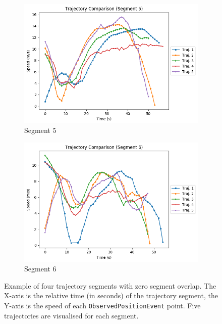 \begin{figure}
\begin{subfigure}[b]{0.475\textwidth}
        \includegraphics[width=\textwidth]{figures/speed_comparison_5}
        \caption[]%
        {{\small Segment 5}}    
        \label{fig:segment-3}
    \end{subfigure}
    \quad
    \begin{subfigure}[b]{0.475\textwidth}   
        \centering 
        \includegraphics[width=\textwidth]{figures/speed_comparison_6}
        \caption[]%
        {{\small Segment 6}}    
        \label{fig:segment-4}
    \end{subfigure}
    \caption[ Example of trajectory segments ]
    {{\small Example of four trajectory segments with zero segment overlap.
    The X-axis is the relative time (in seconds) of the trajectory segment, the Y-axis is the speed of each \texttt{ObservedPositionEvent} point.
    Five trajectories are visualised for each segment.}} 
    \label{fig:segments}
\end{figure}

